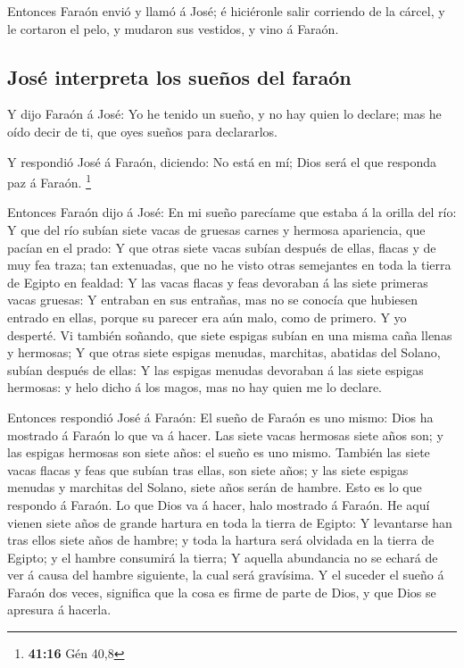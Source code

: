  Entonces Faraón envió y llamó á José; é hiciéronle salir
corriendo de la cárcel, y le cortaron el pelo, y mudaron sus vestidos, y
vino á Faraón.

\hypertarget{josuxe9-interpreta-los-sueuxf1os-del-farauxf3n}{%
\subsection{José interpreta los sueños del
faraón}\label{josuxe9-interpreta-los-sueuxf1os-del-farauxf3n}}

 Y dijo Faraón á José: Yo he tenido un sueño, y no hay
quien lo declare; mas he oído decir de ti, que oyes sueños para
declararlos.

 Y respondió José á Faraón, diciendo: No está en mí; Dios
será el que responda paz á Faraón. \footnote{\textbf{41:16} Gén 40,8}

 Entonces Faraón dijo á José: En mi sueño parecíame que
estaba á la orilla del río:  Y que del río subían siete
vacas de gruesas carnes y hermosa apariencia, que pacían en el prado:
 Y que otras siete vacas subían después de ellas, flacas y
de muy fea traza; tan extenuadas, que no he visto otras semejantes en
toda la tierra de Egipto en fealdad:  Y las vacas flacas y
feas devoraban á las siete primeras vacas gruesas:  Y
entraban en sus entrañas, mas no se conocía que hubiesen entrado en
ellas, porque su parecer era aún malo, como de primero. Y yo desperté.
 Vi también soñando, que siete espigas subían en una misma
caña llenas y hermosas;  Y que otras siete espigas menudas,
marchitas, abatidas del Solano, subían después de ellas:  Y
las espigas menudas devoraban á las siete espigas hermosas: y helo dicho
á los magos, mas no hay quien me lo declare.

 Entonces respondió José á Faraón: El sueño de Faraón es
uno mismo: Dios ha mostrado á Faraón lo que va á hacer. 
Las siete vacas hermosas siete años son; y las espigas hermosas son
siete años: el sueño es uno mismo.  También las siete vacas
flacas y feas que subían tras ellas, son siete años; y las siete espigas
menudas y marchitas del Solano, siete años serán de hambre.
 Esto es lo que respondo á Faraón. Lo que Dios va á hacer,
halo mostrado á Faraón.  He aquí vienen siete años de
grande hartura en toda la tierra de Egipto:  Y levantarse
han tras ellos siete años de hambre; y toda la hartura será olvidada en
la tierra de Egipto; y el hambre consumirá la tierra;  Y
aquella abundancia no se echará de ver á causa del hambre siguiente, la
cual será gravísima.  Y el suceder el sueño á Faraón dos
veces, significa que la cosa es firme de parte de Dios, y que Dios se
apresura á hacerla.

